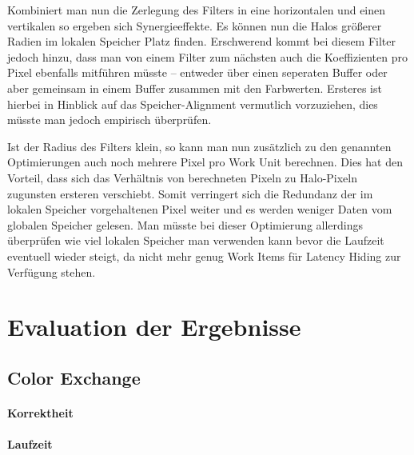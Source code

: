 \documentclass[10pt,a4paper]{article}
\begin{document}
Kombiniert man nun die Zerlegung des Filters in eine horizontalen und einen vertikalen so ergeben sich Synergieeffekte. Es können nun die Halos größerer Radien im lokalen Speicher Platz finden. Erschwerend kommt bei diesem Filter jedoch hinzu, dass man von einem Filter zum nächsten auch die Koeffizienten pro Pixel ebenfalls mitführen müsste -- entweder über einen seperaten Buffer oder aber gemeinsam in einem Buffer zusammen mit den Farbwerten. Ersteres ist hierbei in Hinblick auf das Speicher-Alignment vermutlich vorzuziehen, dies müsste man jedoch empirisch überprüfen.

Ist der Radius des Filters klein, so kann man nun zusätzlich zu den genannten Optimierungen auch noch mehrere Pixel pro Work Unit berechnen. Dies hat den Vorteil, dass sich das Verhältnis von berechneten Pixeln zu Halo-Pixeln zugunsten ersteren verschiebt. Somit verringert sich die Redundanz der im lokalen Speicher vorgehaltenen Pixel weiter und es werden weniger Daten vom globalen Speicher gelesen. Man müsste bei dieser Optimierung allerdings überprüfen wie viel lokalen Speicher man verwenden kann bevor die Laufzeit eventuell wieder steigt, da nicht mehr genug Work Items für Latency Hiding zur Verfügung stehen.

\section{Evaluation der Ergebnisse}
\subsection{Color Exchange}
\paragraph{Korrektheit}
\paragraph{Laufzeit}

\end{document}
